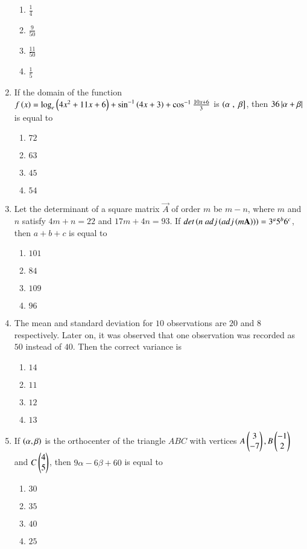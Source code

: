 \documentclass[journal,onecolumn]{IEEEtran}
\theoremstyle{remark}
\begin{document}
\begin{enumerate}
	\begin{enumerate}
		\item $\frac{1}{4}$
		\item $\frac{9}{50}$
		\item $\frac{11}{50}$
		\item $\frac{1}{5}$
	\end{enumerate}

    \item If the domain of the function $f\left(x\right) = \log_{e}\left(4x^2 + 11x + 6\right) + \sin^{-1}\left(4x + 3\right) + \cos^{-1}\frac{10x + 6}{3}$ is $\left(\alpha\right., {}\left.\beta\right]$, then $36\left\vert\alpha + \beta\right\vert$ is equal to 

	\begin{enumerate}
		\item $72$ 
		\item $63$
		\item $45$
		\item $54$
	\end{enumerate}

    \item Let the determinant of a square matrix $\vec{A}$ of order $m$ be $m - n$, where $m$ and $n$ satisfy $4m + n = 22$ and $17m + 4n = 93$. If $det\left(n\; adj\left(adj\left(m\mathbf{A}\right)\right)\right) = 3^{a}5^{b}6^{c}$, then $a + b + c$ is equal to

	\begin{enumerate}
		\item $101$ 
		\item $84$
		\item $109$
		\item $96$
	\end{enumerate}


    \item The mean and standard deviation for $10$ observations are $20$ and $8$ respectively. Later on, it was observed that one observation was recorded as $50$ instead of $40$. Then the correct variance is

	\begin{enumerate}
		\item $14$ 
		\item $11$
		\item $12$
		\item $13$
	\end{enumerate}

    \item If $\left(\alpha, \beta\right)$ is the orthocenter of the triangle $ABC$ with vertices $A\begin{pmatrix}3\\-7\end{pmatrix}, B\begin{pmatrix}-1\\2\end{pmatrix}$ and $C\begin{pmatrix}4\\5\end{pmatrix}$, then $9\alpha - 6\beta + 60$ is equal to

	\begin{enumerate}
		\item $30$ 
		\item $35$
		\item $40$
		\item $25$
	\end{enumerate}

\end{enumerate}
\end{document}
